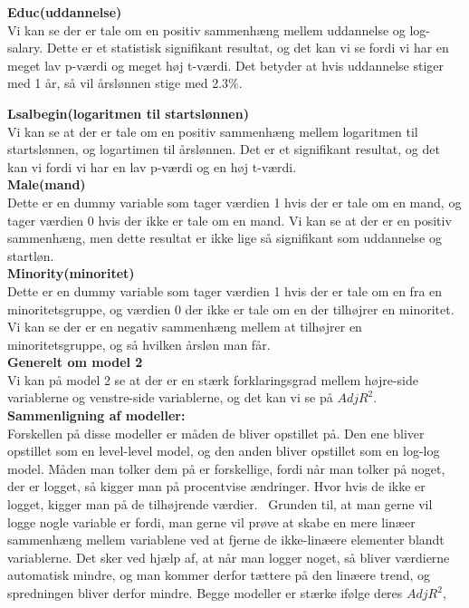 \documentclass[
  10pt,
]{article}
\begin{document}
\textbf{Educ(uddannelse)}\\
Vi kan se der er tale om en positiv sammenhæng mellem uddannelse og
log-salary. Dette er et statistisk signifikant resultat, og det kan vi
se fordi vi har en meget lav p-værdi og meget høj t-værdi. Det betyder
at hvis uddannelse stiger med 1 år, så vil årslønnen stige med 2.3\%.
\newline

\textbf{Lsalbegin(logaritmen til startslønnen)}\\
Vi kan se at der er tale om en positiv sammenhæng mellem logaritmen til
startslønnen, og logartimen til årslønnen. Det er et signifikant
resultat, og det kan vi fordi vi har en lav p-værdi og en høj t-værdi.\\

\textbf{Male(mand)}\\
Dette er en dummy variable som tager værdien 1 hvis der er tale om en
mand, og tager værdien 0 hvis der ikke er tale om en mand. Vi kan se at
der er en positiv sammenhæng, men dette resultat er ikke lige så
signifikant som uddannelse og startløn.\\

\textbf{Minority(minoritet)}\\
Dette er en dummy variable som tager værdien 1 hvis der er tale om en
fra en minoritetsgruppe, og værdien 0 der ikke er tale om en der
tilhøjrer en minoritet. Vi kan se der er en negativ sammenhæng mellem at
tilhøjrer en minoritetsgruppe, og så hvilken årsløn man får.\\

\textbf{Generelt om model 2}\\
Vi kan på model 2 se at der er en stærk forklaringsgrad mellem
højre-side variablerne og venstre-side variablerne, og det kan vi se på
\(AdjR^2\).\\

\textbf{Sammenligning af modeller:}\\
Forskellen på disse modeller er måden de bliver opstillet på. Den ene
bliver opstillet som en level-level model, og den anden bliver opstillet
som en log-log model. Måden man tolker dem på er forskellige, fordi når
man tolker på noget, der er logget, så kigger man på procentvise
ændringer. Hvor hvis de ikke er logget, kigger man på de tilhøjrende
værdier. ~Grunden til, at man gerne vil logge nogle variable er fordi,
man gerne vil prøve at skabe en mere linæer sammenhæng mellem variablene
ved at fjerne de ikke-linæere elementer blandt variablerne. Det sker ved
hjælp af, at når man logger noget, så bliver værdierne automatisk
mindre, og man kommer derfor tættere på den linæere trend, og
spredningen bliver derfor mindre. Begge modeller er stærke ifølge deres
\(AdjR^2\),\\
\newpage
\end{document}
